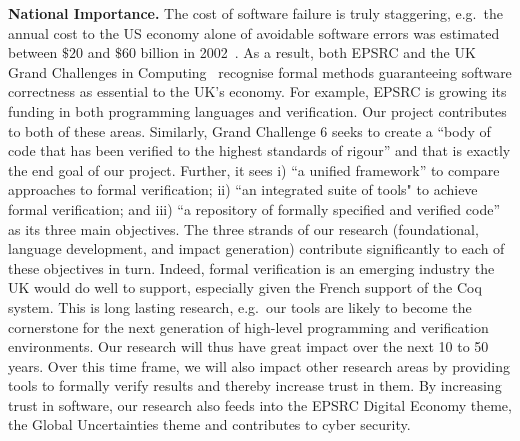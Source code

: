\documentclass[a4paper,11pt]{article}
\newcommand{\eg}{{e.g.}\ }
\begin{document}
{\bf National Importance.}  The cost of software failure is truly
staggering, \eg the annual cost to the US economy alone of avoidable
software errors was estimated between $\$ 20$ and $\$60$
billion in 2002~\cite{grandchallenges}.  As a result, both EPSRC and
the UK Grand Challenges in Computing~\cite{grandchallenges} recognise
formal methods guaranteeing software correctness as essential to the
UK's economy. For example, EPSRC is growing its funding in both
programming languages and verification. Our project contributes to
both of these areas. Similarly, Grand Challenge 6 seeks to create a
``body of code that has been verified to the highest standards of
rigour'' and that is exactly the end goal of our project. Further, it
sees i) ``a unified framework'' to compare approaches to formal
verification; ii) ``an integrated suite of tools" to achieve formal
verification; and iii) ``a repository of formally specified and
verified code'' as its three main objectives. The three strands of our
research (foundational, language development, and impact generation)
contribute significantly to each of these objectives in turn.  Indeed,
formal verification is an emerging industry the UK would do well to
support, especially given the French support of the Coq system. This
is long lasting research, \eg our tools are likely to become the
cornerstone for the next generation of high-level programming and
verification environments. Our research will thus have great impact
over the next 10 to 50 years.  Over this time frame, we will also
impact other research areas by providing tools to formally verify
results and thereby increase trust in them. By increasing trust in
software, our research also feeds into the EPSRC Digital Economy
theme, the Global Uncertainties theme and contributes to cyber
security.
\end{document}
